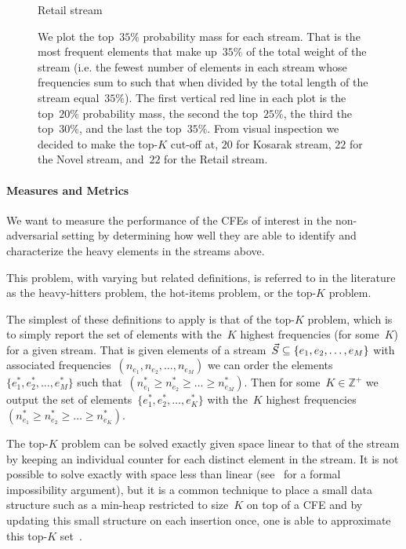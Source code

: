 \begin{figure}[!ht]
    \caption*{Retail stream}
  \endminipage
  \caption{We plot the top~$35\%$ probability mass for each stream. That is the most frequent elements that make up~$35\%$ of the total weight of the stream (i.e. the fewest number of elements in each stream whose frequencies sum to such that when divided by the total length of the stream equal~$35\%$). The first vertical red line in each plot is the top~$20\%$ probability mass, the second the top~$25\%$, the third the top~$30\%$, and the last the top~$35\%$. From visual inspection we decided to make the top-$K$ cut-off at, $20$ for Kosarak stream, $22$ for the Novel stream, and~$22$ for the Retail stream.}
  \label{fig:stream_pm} 
\end{figure}
\paragraph{Measures and Metrics} We want to measure the performance of the CFEs of interest in the non-adversarial setting by determining how well they are able to identify and characterize the heavy elements in the streams above. %

This problem, with varying but related definitions, is referred to in the literature as the heavy-hitters problem, the hot-items problem, or the top-$K$ problem. 

The simplest of these definitions to apply is that of the top-$K$ problem, which is to simply report the set of elements with the~$K$ highest frequencies (for some~$K$) for a given stream. That is given elements of a stream~$\vec{S} \subseteq  \{ e_1,e_2,\ldots,e_M \}$ with associated frequencies~$(n_{e_1},n_{e_2},\ldots,n_{e_M})$ we can order the elements~$\{ e^{*}_{1},e^{*}_{2},\ldots,e^{*}_{M} \}$ such that~$(n^{*}_{e_1} \geq n^{*}_{e_2} \geq \ldots \geq n^{*}_{e_M})$. Then for some~$K \in \mathbb{Z}^{+}$ we output the set of elements~$\{ e^{*}_{1},e^{*}_{2},\ldots,e^{*}_{K} \}$ with the~$K$ highest frequencies~$(n^{*}_{e_1} \geq n^{*}_{e_2} \geq \ldots \geq n^{*}_{e_K})$.

The top-$K$ problem can be solved exactly given space linear to that of the stream by keeping an individual counter for each distinct element in the stream. It is not possible to solve exactly with space less than linear (see~\cite{Roughgarden_Valiant} for a formal impossibility argument), but it is a common technique to place a small data structure such as a min-heap restricted to size~$K$ on top of a CFE and by updating this small structure on each insertion once, one is able to approximate this top-$K$ set~\cite{yang2019heavykeeper,mandal2018topkapi,metwally2006}.

